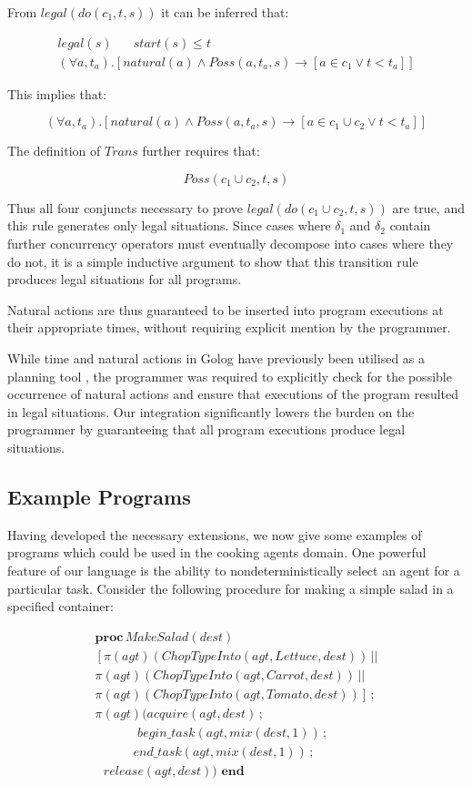 \documentclass[letterpaper]{article}
\begin{document}
From $legal(do(c_{1},t,s))$ it can be inferred that:

\[
\begin{array}{c}
legal(s)\,\,\,\,\,\,\,\,\,\, start(s)\leq t\\
(\forall a,t_{a}).\left[natural(a)\wedge Poss(a,t_{a},s)\rightarrow\left[a\in c_{1}\vee t<t_{a}\right]\right]\end{array}\]


This implies that:

\[
(\forall a,t_{a}).\left[natural(a)\wedge Poss(a,t_{a},s)\rightarrow\left[a\in c_{1}\cup c_{2}\vee t<t_{a}\right]\right]\]


The definition of $Trans$ further requires that:

\[
Poss(c_{1}\cup c_{2},t,s)\]


Thus all four conjuncts necessary to prove $legal(do(c_{1}\cup c_{2},t,s))$
are true, and this rule generates only legal situations. Since cases
where $\delta_{1}$ and $\delta_{2}$ contain further concurrency
operators must eventually decompose into cases where they do not,
it is a simple inductive argument to show that this transition rule
produces legal situations for all programs.

Natural actions are thus guaranteed to be inserted into program executions
at their appropriate times, without requiring explicit mention by
the programmer.

While time and natural actions in Golog have previously been utilised
as a planning tool \cite{pirri00planning_nat_acts}, the programmer
was required to explicitly check for the possible occurrence of natural
actions and ensure that executions of the program resulted in legal
situations. Our integration significantly lowers the burden on the
programmer by guaranteeing that all program executions produce legal
situations.


\subsection{Example Programs}

Having developed the necessary extensions, we now give some examples
of programs which could be used in the cooking agents domain. One
powerful feature of our language is the ability to nondeterministically
select an agent for a particular task. Consider the following procedure
for making a simple salad in a specified container:

\[
\begin{array}{c}
\mathbf{proc}\, MakeSalad(dest)\\
\left[\pi(agt)(ChopTypeInto(agt,Lettuce,dest))\,||\right.\\
\pi(agt)(ChopTypeInto(agt,Carrot,dest))\,||\\
\left.\pi(agt)(ChopTypeInto(agt,Tomato,dest))\right]\,;\\
\pi(agt)(acquire(agt,dest)\,;\\
\,\,\,\,\,\,\,\,\,\,\,\,\,\,\,\,\,\,\,\, begin\_ task(agt,mix(dest,1))\,;\\
\,\,\,\,\,\,\,\,\,\,\,\,\,\,\,\,\,\, end\_ task(agt,mix(dest,1))\,;\\
\,\,\,\, release(agt,dest))\,\,\mathbf{end}\end{array}\]
\end{document}

